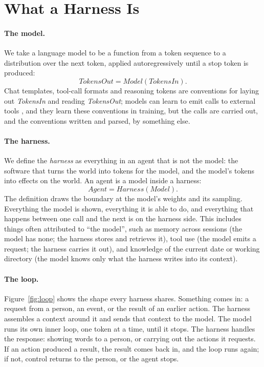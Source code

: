\section{What a Harness Is}
\label{sec:harness}

\paragraph{The model.} We take a language model to be a function from a token sequence to a distribution over the next token, applied autoregressively until a stop token is produced:
\[
  \textit{TokensOut} = \textit{Model}(\textit{TokensIn}).
\]
Chat templates, tool-call formats and reasoning tokens are conventions for laying out \textit{TokensIn} and reading \textit{TokensOut}; models can learn to emit calls to external tools \citep{schick2023toolformer}, and they learn these conventions in training, but the calls are carried out, and the conventions written and parsed, by something else.

\paragraph{The harness.} We define the \emph{harness} as everything in an agent that is not the model: the software that turns the world into tokens for the model, and the model's tokens into effects on the world. An agent is a model inside a harness:
\[
  \textit{Agent} = \textit{Harness}(\textit{Model}).
\]
The definition draws the boundary at the model's weights and its sampling. Everything the model is shown, everything it is able to do, and everything that happens between one call and the next is on the harness side. This includes things often attributed to ``the model'', such as memory across sessions (the model has none; the harness stores and retrieves it), tool use (the model emits a request; the harness carries it out), and knowledge of the current date or working directory (the model knows only what the harness writes into its context).

\paragraph{The loop.} Figure~\ref{fig:loop} shows the shape every harness shares. Something comes in: a request from a person, an event, or the result of an earlier action. The harness assembles a context around it and sends that context to the model. The model runs its own inner loop, one token at a time, until it stops. The harness handles the response: showing words to a person, or carrying out the actions it requests. If an action produced a result, the result comes back in, and the loop runs again; if not, control returns to the person, or the agent stops.

